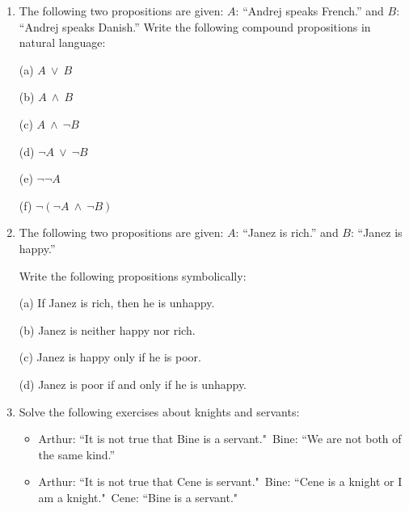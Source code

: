 \documentclass[11pt,paper=b5,footinclude,headinclude]{scrbook} %
\def\ali {{~\vee~}}
\def\inn {{~\wedge~}}
\def\sledi {{~\Rightarrow~}}
\theoremstyle{remark}
\theoremstyle{definition} %
\theoremstyle{theorem} %
\begin{document}
\begin{enumerate}
Torej je sklepanje pravilno.\qed


%
%
%
%
%
%
%
%
%
%
%
%
%
%
%
%
%
%
%
%
%
%
%
%
%
%
%


\item
The following two propositions are given:
$A$: ``Andrej speaks French.'' and $B$: ``Andrej speaks Danish.''
Write the following compound propositions in natural language:

(a) $A\ali B$

(b) $A\inn B$

(c) $A\inn \neg B$

(d) $\neg A\ali \neg B$

(e) $\neg \neg A$

(f) $\neg (\neg A\inn \neg B)$

\medskip
\item
The following two propositions are given:
$A$: ``Janez is rich.'' and $B$: ``Janez is happy.''

Write the following propositions symbolically:

(a) If Janez is rich, then he is unhappy.

(b) Janez is neither happy nor rich.

(c) Janez is happy only if he is poor.

(d) Janez is poor if and only if he is unhappy.

\item Solve the following exercises about knights and servants:
\begin{itemize}
  \item Arthur: ``It is not true that Bine is a servant."~Bine: ``We are not both of the same kind.''
  \item Arthur: ``It is not true that Cene is servant."~Bine: ``Cene is a knight or I am a knight."~Cene: ``Bine is a servant."
\end{itemize}


\end{enumerate}
\end{document}

